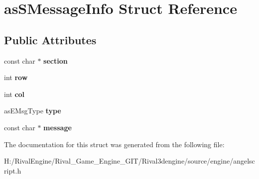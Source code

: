 \hypertarget{structas_s_message_info}{}\section{as\+S\+Message\+Info Struct Reference}
\label{structas_s_message_info}
\subsection*{Public Attributes}
\begin{DoxyCompactItemize}
\item 
\mbox{\label{structas_s_message_info_aeca6368be12c84b62ed8c659b1e4615c}} 
const char $\ast$ {\bfseries section}
\item 
\mbox{\label{structas_s_message_info_a21ef80321436f229a547411a6598ea21}} 
int {\bfseries row}
\item 
\mbox{\label{structas_s_message_info_a08b23a360ac52110323bbf4aad553d9d}} 
int {\bfseries col}
\item 
\mbox{\label{structas_s_message_info_a6aa9231534b8aea2a3099cdc3206bcc8}} 
as\+E\+Msg\+Type {\bfseries type}
\item 
\mbox{\label{structas_s_message_info_af76694c6342dd82ef6aca0dff42072f5}} 
const char $\ast$ {\bfseries message}
\end{DoxyCompactItemize}


The documentation for this struct was generated from the following file\+:\begin{DoxyCompactItemize}
\item 
H\+:/\+Rival\+Engine/\+Rival\+\_\+\+Game\+\_\+\+Engine\+\_\+\+G\+I\+T/\+Rival3dengine/source/engine/angelscript.\+h\end{DoxyCompactItemize}
